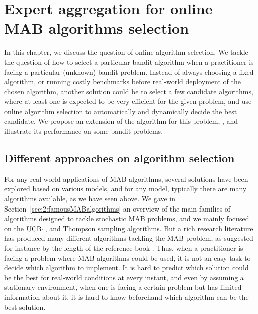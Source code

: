 
\chapter{Expert aggregation for online MAB algorithms selection}
\label{chapter:25}

\graphicspath{{2-Chapters/2-Chapter/Images/}}

\abstractStartChapter{}%
%
In this chapter, we discuss the question of online algorithm selection.
%
We tackle the question of how to select a particular bandit algorithm when a practitioner is facing a particular (unknown) bandit problem.
Instead of always choosing a fixed algorithm, or running costly benchmarks before real-world deployment of the chosen algorithm, another solution could be to select a few candidate algorithms, where at least one is expected to be very efficient for the given problem, and use online algorithm selection to automatically and dynamically decide the best candidate.
We propose an extension of the \ExpFour{} algorithm for this problem, \Aggr, and illustrate its performance on some bandit problems.

\minitocStartChapter{}


\section{Different approaches on algorithm selection}
\label{sec:25:chooseYourPreferredBanditAlgorithm}

For any real-world applications of MAB algorithms,
several solutions have been explored based on various models, and for any model, typically there are many algorithms available, as we have seen above.
%
We gave in Section~\ref{sec:2:famousMABalgorithms} an overview of the main families of algorithms designed to tackle stochastic MAB problems, and we mainly focused on the $\mathrm{UCB}_1$, \klUCB{} and Thompson sampling algorithms.
But a rich research literature has produced many different algorithms tackling the MAB problem, as suggested for instance by the length of the reference book \cite{LattimoreBanditAlgorithmsBook}.
%
Thus, when a practitioner is facing a problem where MAB algorithms could be used, it is not an easy task to decide which algorithm to implement.
It is hard to predict which solution could be the best for real-world conditions at every instant,
and even by assuming a stationary environment, when one is facing a certain problem but has limited information about it, it is hard to know beforehand which algorithm can be the best solution.

